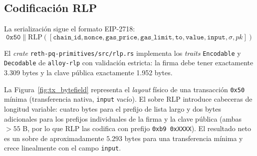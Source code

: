 \subsection{Codificación RLP}

La serialización sigue el formato EIP-2718:
\begin{equation}
  \texttt{0x50} \| \text{RLP}([\texttt{chain\_id}, \texttt{nonce}, \texttt{gas\_price}, \texttt{gas\_limit}, \texttt{to}, \texttt{value}, \texttt{input}, \sigma, \mathit{pk}])
\end{equation}

El \emph{crate} \texttt{reth-pq-primitives/src/rlp.rs} implementa los \emph{traits} \texttt{Encodable} y \texttt{Decodable} de \texttt{alloy-rlp} con validación estricta: la firma debe tener exactamente 3.309 bytes y la clave pública exactamente 1.952 bytes.

La Figura~\ref{fig:tx_bytefield} representa el \emph{layout} físico de una transacción \texttt{0x50} mínima (transferencia nativa, \texttt{input} vacío). El sobre RLP introduce cabeceras de longitud variable: cuatro bytes para el prefijo de lista largo y dos bytes adicionales para los prefijos individuales de la firma y la clave pública (ambas $> 55$ B, por lo que RLP las codifica con prefijo \texttt{0xb9 0xXXXX}). El resultado neto es un sobre de aproximadamente $5.293$ bytes para una transferencia mínima y crece linealmente con el campo \texttt{input}.

